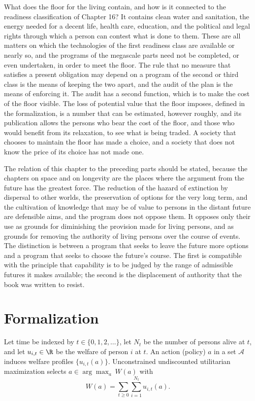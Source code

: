 What does the floor for the living contain, and how is it connected to the readiness classification of Chapter 16? It contains clean water and sanitation, the energy needed for a decent life, health care, education, and the political and legal rights through which a person can contest what is done to them. These are all matters on which the technologies of the first readiness class are available or nearly so, and the programs of the megascale parts need not be completed, or even undertaken, in order to meet the floor. The rule that no measure that satisfies a present obligation may depend on a program of the second or third class is the means of keeping the two apart, and the audit of the plan is the means of enforcing it. The audit has a second function, which is to make the cost of the floor visible. The loss of potential value that the floor imposes, defined in the formalization, is a number that can be estimated, however roughly, and its publication allows the persons who bear the cost of the floor, and those who would benefit from its relaxation, to see what is being traded. A society that chooses to maintain the floor has made a choice, and a society that does not know the price of its choice has not made one.

The relation of this chapter to the preceding parts should be stated, because the chapters on space and on longevity are the places where the argument from the future has the greatest force. The reduction of the hazard of extinction by dispersal to other worlds, the preservation of options for the very long term, and the cultivation of knowledge that may be of value to persons in the distant future are defensible aims, and the program does not oppose them. It opposes only their use as grounds for diminishing the provision made for living persons, and as grounds for removing the authority of living persons over the course of events. The distinction is between a program that seeks to leave the future more options and a program that seeks to choose the future's course. The first is compatible with the principle that capability is to be judged by the range of admissible futures it makes available; the second is the displacement of authority that the book was written to resist.

\section*{Formalization}

Let time be indexed by $t\in\{0,1,2,\dots\}$, let $N_t$ be the number of persons alive at $t$, and let $u_{i,t}\in\R$ be the welfare of person $i$ at $t$. An action (policy) $a$ in a set $\mathcal{A}$ induces welfare profiles $\{u_{i,t}(a)\}$. Unconstrained undiscounted utilitarian maximization selects $a\in\arg\max_{a}\ W(a)$ with
\[
W(a)=\sum_{t\ge0}\sum_{i=1}^{N_t}u_{i,t}(a).
\]

